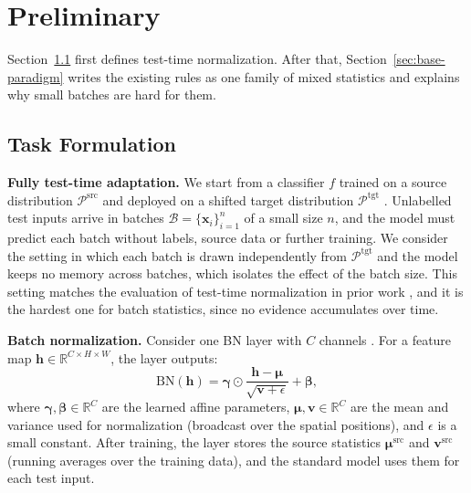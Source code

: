 \section{Preliminary}
Section~\ref{sec:task-formulation} first defines test-time normalization.
After that, Section~\ref{sec:base-paradigm} writes the existing rules as one family of mixed statistics and explains why small batches are hard for them.

\subsection{Task Formulation} \label{sec:task-formulation}
\textbf{Fully test-time adaptation.} We start from a classifier $f$ trained on a source distribution $\mathcal{P}^{\text{src}}$ and deployed on a shifted target distribution $\mathcal{P}^{\text{tgt}}$ \cite{TENT}.
Unlabelled test inputs arrive in batches $\mathcal{B} = \{\mathbf{x}_i\}_{i=1}^{n}$ of a small size $n$, and the model must predict each batch without labels, source data or further training.
We consider the setting in which each batch is drawn independently from $\mathcal{P}^{\text{tgt}}$ and the model keeps no memory across batches, which isolates the effect of the batch size.
This setting matches the evaluation of test-time normalization in prior work \cite{PredictionBN, BN-Adapt}, and it is the hardest one for batch statistics, since no evidence accumulates over time.

\textbf{Batch normalization.} Consider one BN layer with $C$ channels \cite{BatchNorm}.
For a feature map $\mathbf{h} \in \mathbb{R}^{C \times H \times W}$, the layer outputs:
\begin{equation}\label{eq:bn}
\mathrm{BN}(\mathbf{h}) = \boldsymbol{\gamma} \odot \frac{\mathbf{h} - \boldsymbol{\mu}}{\sqrt{\mathbf{v} + \epsilon}} + \boldsymbol{\beta},
\end{equation}
where $\boldsymbol{\gamma}, \boldsymbol{\beta} \in \mathbb{R}^{C}$ are the learned affine parameters, $\boldsymbol{\mu}, \mathbf{v} \in \mathbb{R}^{C}$ are the mean and variance used for normalization (broadcast over the spatial positions), and $\epsilon$ is a small constant.
After training, the layer stores the source statistics $\boldsymbol{\mu}^{\text{src}}$ and $\mathbf{v}^{\text{src}}$ (running averages over the training data), and the standard model uses them for each test input.

